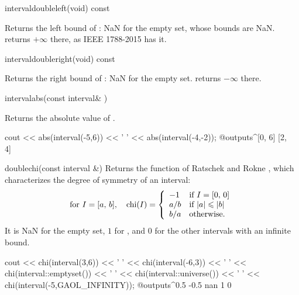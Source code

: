 \documentclass[12pt,a4paper,twoside,openright]{book}
\begin{document}
\begin{defmethod}{interval}{double}{left}{(void) const}
  \begin{operation}
  \end{operation}
  Returns the left bound of : NaN for the empty set, whose
  bounds are NaN.  returns $+\infty$ there, as
  IEEE 1788-2015 has it.
\end{defmethod}

\begin{defmethod}{interval}{double}{right}{(void) const}
  \begin{operation}
  \end{operation}
  Returns the right bound of : NaN for the empty set.
   returns $-\infty$ there.
\end{defmethod}

\begin{deffun}{interval}{abs}{(const interval\& )}
  \begin{operation}
  \end{operation}
  Returns the absolute value of .
  \begin{example}
cout << abs(interval(-5,6)) << ' '
     << abs(interval(-4,-2));
@outputs^[0, 6] [2, 4]~
  \end{example}
\end{deffun}

\begin{deffun}{double}{chi}{(const interval \&)}
  Returns the function  of Ratschek and Rokne
  \cite{Ratschek-Rokne:1995}, which characterizes the degree of symmetry
  of an interval:
\begin{equation*}
\text{for } I=[a,\,b],\quad\text{chi}(I)=\left\{\begin{array}{ll}
    -1  & \text{if } I = [0,\,0]\\
    a/b & \text{if } |a|\leqslant |b|\\
    b/a & \text{otherwise.}
  \end{array}\right.
\end{equation*}
  It is NaN for the empty set, $1$ for \itv{-\infty}{+\infty}, and $0$ for
  the other intervals with an infinite bound.
\begin{example}
cout << chi(interval(3,6)) << ' '
     << chi(interval(-6,3)) << ' '
     << chi(interval::emptyset()) << ' '
     << chi(interval::universe()) << ' '
     << chi(interval(-5,GAOL_INFINITY));
@outputs^0.5 -0.5 nan 1 0~
\end{example}
\end{deffun}
\end{document}
